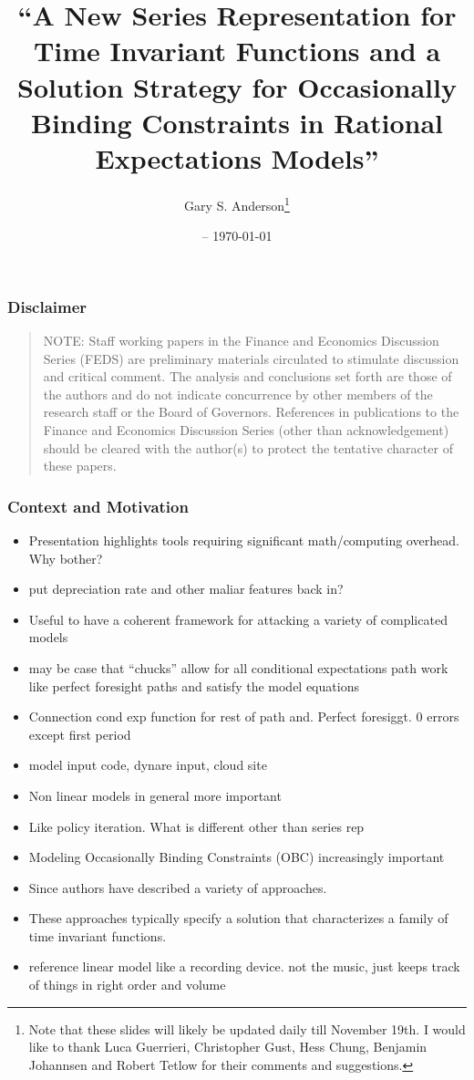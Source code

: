 \documentclass[letter]{beamer}
\title{``A New Series Representation for Time Invariant Functions and
a Solution Strategy for Occasionally Binding Constraints in Rational Expectations Models''}
\date{\currenttime -- \today }
\author{Gary S. Anderson\thanks{Note that these slides will likely be updated daily till November 19th. I would like to thank Luca Guerrieri, Christopher Gust, Hess Chung, Benjamin Johannsen  and Robert Tetlow for their comments and suggestions. }}
\begin{document}
\begin{frame}
  \titlepage
\end{frame}

\begin{frame}
  \frametitle{Disclaimer}
  \begin{quote}
    NOTE: Staff working papers in the Finance and Economics Discussion Series (FEDS) are preliminary materials circulated to stimulate discussion and critical comment. The analysis and conclusions set forth are those of the authors and do not indicate concurrence by other members of the research staff or the Board of Governors. References in publications to the Finance and Economics Discussion Series (other than acknowledgement) should be cleared with the author(s) to protect the tentative character of these papers.
  \end{quote}
\end{frame}

\begin{frame}
  \frametitle{Context and Motivation}
  \begin{itemize}
  \item Presentation highlights tools requiring significant math/computing overhead.
Why bother?
\item put depreciation rate and other maliar features back in?
  \item Useful to have  a coherent framework for attacking a variety of complicated models
  \item may be case that ``chucks'' allow for all conditional expectations path 
work like perfect foresight paths and satisfy the model equations
\item Connection cond exp function  for rest of path and. Perfect foresiggt.  0 errors except first period
\item model input code, dynare input, cloud site
  \item Non linear models in general more important
  \item Like policy iteration. What is different other than series rep
  \item Modeling Occasionally Binding Constraints (OBC) increasingly important
  \item Since \cite{Christiano2000} authors have described a 
variety of approaches.

\cite{holden15:_exist_dsge,guerrieri15:_occbin,benigno09,hintermaier10,brumm10,nakov08,haefke98,nakata12,gordon11,billi11,Hintermaier2010,Guerrieri2015}
\item These approaches typically specify a solution that characterizes a family of
time invariant functions.
\item reference linear model like a recording device. not the music, just keeps track of things in right order and volume
  \end{itemize}
\end{frame}
\end{document}
